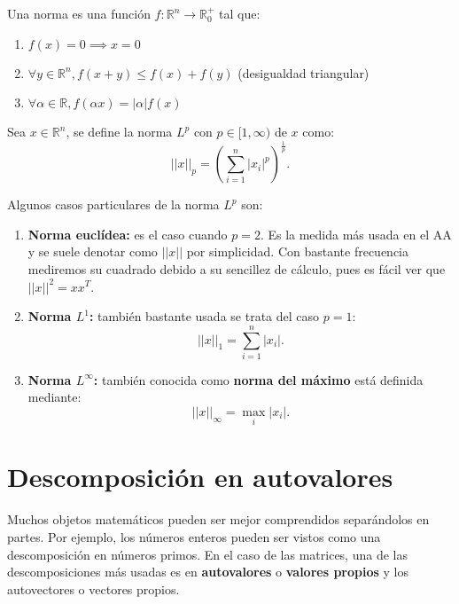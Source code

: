 \begin{definition}
    Una norma es una función $f: \mathbb{R}^n \to \mathbb{R}^+_0$ tal que:
    \begin{enumerate}
        \item $f(x) = 0 \implies x = 0$
        \item $\forall y \in \mathbb{R}^n, f(x + y) \le f(x) + f(y)$ (desigualdad triangular)
        \item $\forall \alpha \in \mathbb{R}, f(\alpha x)=|\alpha|f(x)$
    \end{enumerate}
\end{definition}

\begin{definition}
    Sea $x \in \mathbb{R}^n$, se define la norma $L^p$ con $p \in [1, \infty)$ de $x$ como:
    \begin{equation}
        || x ||_p = (\sum_{i=1}^n |x_i|^p)^\frac{1}{p}.
    \end{equation}
\end{definition}

Algunos casos particulares de la norma $L^p$ son:
\begin{enumerate}
    \item \textbf{Norma euclídea:} es el caso cuando $p=2$. Es la medida más usada en el \ac{AA} y se suele denotar como $||x||$ por simplicidad. Con bastante frecuencia mediremos su cuadrado debido a su sencillez de cálculo, pues es fácil ver que $||x||^2=xx^T$.
    \item \textbf{Norma $L^1$:} también bastante usada se trata del caso $p=1$:
    \begin{equation}
        ||x||_1 = \sum_{i=1}^n |x_i|.
    \end{equation}
    \item \textbf{Norma $L^\infty$:} también conocida como \textbf{norma del máximo} está definida mediante:
    \begin{equation}
        ||x||_\infty = \max_i |x_i|.
    \end{equation}
\end{enumerate}

\section{Descomposición en autovalores}
Muchos objetos matemáticos pueden ser mejor comprendidos separándolos en partes. Por ejemplo, los números enteros pueden ser vistos como una descomposición en números primos. En el caso de las matrices, una de las descomposiciones más usadas es en \textbf{autovalores} o \textbf{valores propios} y los autovectores o vectores propios.

